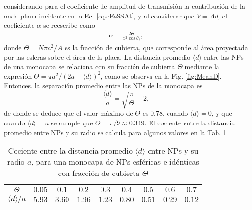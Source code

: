 \noindent considerando para el coeficiente de amplitud de transmisión la contribución de la onda plana incidente en la Ec. \eqref{eqs:EsSSAt}, y al considerar que $V = A d$, el coeficiente $\alpha$ se reescribe como
	\begin{align}
	\alpha = \frac{2\Theta}{x^2 \cos\theta_i},
	\label{eq:alpha}
	\end{align}
donde $\Theta = N \pi a^2 / A$ es la fracción de cubierta, que corresponde al área proyectada por las esferas sobre el área de la placa. La distancia promedio $\langle d \rangle$ entre las NPs de una monocapa se relaciona con su fracción de cubierta $\Theta$ mediante la expresión $\Theta = \pi a^2 / (2a+\langle d \rangle)^2$, como se observa en la Fig. \ref{fig:MeanD}. Entonces, la separación promedio entre las NPs de la monocapa es
	\begin{equation}
	\frac{\langle d \rangle}{a} = \sqrt{\frac{\pi}{\Theta}}-2,
	\label{eq:MeanD}
	\end{equation}
de donde se deduce que el valor máximo de $\Theta$ es $0.78$, cuando $\langle d\rangle=0$, y que cuando $\langle d \rangle = a$ se cumple que $\Theta = \pi/9\approx 0.349$. El cociente entre la distancia promedio entre NPs y su radio se calcula para algunos valores en la Tab. \ref{tab:meanD}

\begin{table}[h!] \centering
	\caption{Cociente entre la distancia promedio $\langle d\rangle$ entre NPs y su radio $a$, para una monocapa de NPs esféricas e idénticas con fracción de cubierta $\Theta$}
	\label{tab:meanD}\vspace*{-1em}
	\begin{tabular}{c || c c c c c c c c}
	\hline \hline
	$\Theta$ & $0.05$ & $0.1$ & $0.2$ & $0.3$ & $0.4$ & $0.5$ & $0.6$ & $0.7$\\
 \hline 
	$\langle d\rangle / a $& $5.93$ & $3.60$ & $1.96$ & $1.23$ & $0.80$ & $0.51$ & $0.29$ & $0.12$ \\
	\hline \hline
	\end{tabular} 
\end{table}

